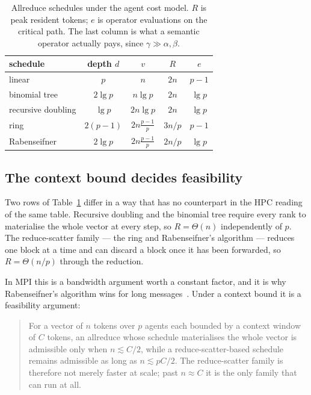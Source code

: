 \begin{table}[t]
\centering
\small
\caption{Allreduce schedules under the agent cost model. $R$ is peak resident
tokens; $e$ is operator evaluations on the critical path. The last column is
what a semantic operator actually pays, since $\gamma \gg \alpha, \beta$.}
\label{tab:allreduce-cost}
\begin{tabular}{@{}lcccc@{}}
\toprule
schedule & depth $d$ & $v$ & $R$ & $e$ \\
\midrule
linear              & $p$        & $n$              & $2n$   & $p-1$ \\
binomial tree       & $2\lg p$   & $n \lg p$        & $2n$   & $\lg p$ \\
recursive doubling  & $\lg p$    & $2n \lg p$       & $2n$   & $\lg p$ \\
ring                & $2(p{-}1)$ & $2n\frac{p-1}{p}$ & $3n/p$ & $p-1$ \\
Rabenseifner        & $2\lg p$   & $2n\frac{p-1}{p}$ & $2n/p$ & $\lg p$ \\
\bottomrule
\end{tabular}
\end{table}

\subsection{The context bound decides feasibility}

Two rows of Table~\ref{tab:allreduce-cost} differ in a way that has no
counterpart in the HPC reading of the same table.  Recursive doubling and the
binomial tree require every rank to materialise the whole vector at every step,
so $R = \Theta(n)$ independently of $p$.  The reduce-scatter family --- the ring
and Rabenseifner's algorithm --- reduces one block at a time and can discard a
block once it has been forwarded, so $R = \Theta(n/p)$ through the reduction.

In MPI this is a bandwidth argument worth a constant factor, and it is why
Rabenseifner's algorithm wins for long messages~\cite{rabenseifner2004reduction,
thakur2005collectives}.  Under a context bound it is a feasibility argument:

\begin{quote}
For a vector of $n$ tokens over $p$ agents each bounded by a context window of
$C$ tokens, an allreduce whose schedule materialises the whole vector is
admissible only when $n \lesssim C/2$, while a reduce-scatter-based schedule
remains admissible as long as $n \lesssim pC/2$.  The reduce-scatter family is
therefore not merely faster at scale; past $n \approx C$ it is the only family
that can run at all.
\end{quote}

